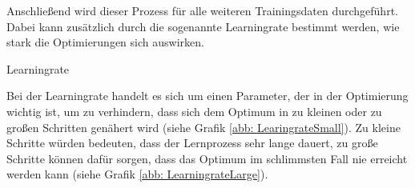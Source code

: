 Anschließend wird dieser Prozess für alle weiteren Trainingsdaten durchgeführt. Dabei kann zusätzlich durch die sogenannte Learningrate bestimmt werden, wie stark die Optimierungen sich auswirken. 

\begin{definition}
	Learningrate
	
	Bei der Learningrate handelt es sich um einen Parameter, der in der Optimierung wichtig ist, um zu verhindern, dass sich dem Optimum in zu kleinen oder zu großen Schritten genähert wird (siehe Grafik \ref{abb: LearingrateSmall}). Zu kleine Schritte würden bedeuten, dass der Lernprozess sehr lange dauert, zu große Schritte können dafür sorgen, dass das Optimum im schlimmsten Fall nie erreicht werden kann (siehe Grafik \ref{abb: LearningrateLarge}). \cite{Geron 2017}
\end{definition}

